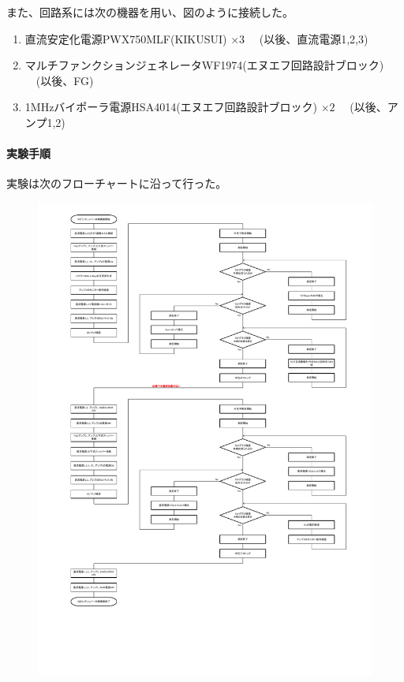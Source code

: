 また、回路系には次の機器を用い、図のように接続した。
\begin{enumerate}
\renewcommand{\labelenumi}{(\roman{enumi})}
\item 直流安定化電源PWX750MLF(KIKUSUI) $\times 3$ \ \ (以後、直流電源1,2,3)
\item マルチファンクションジェネレータWF1974(エヌエフ回路設計ブロック) \ \ (以後、FG)
\item 1MHzバイポーラ電源HSA4014(エヌエフ回路設計ブロック) $\times 2$ \ \ (以後、アンプ1,2)
\end{enumerate}

\clearpage
\paragraph{実験手順}
実験は次のフローチャートに沿って行った。
\begin{figure}[h]
\centering
\includegraphics[width=\hsize]{resonance/whatwhyhow/Resonance_flow.pdf}
\vspace{-4cm}
\end{figure}

